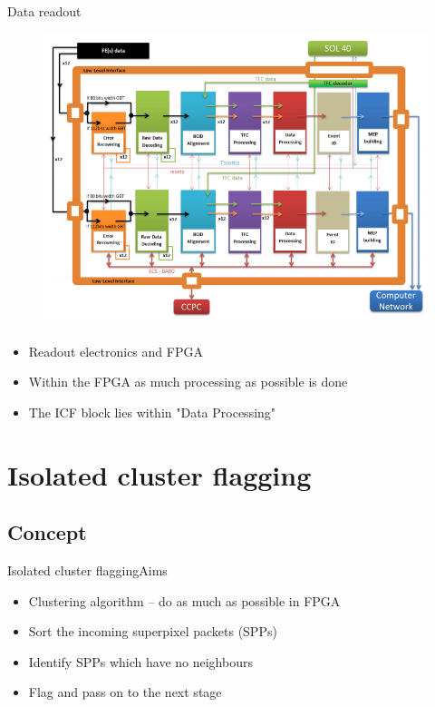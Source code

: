 \documentclass{beamer}
\begin{document}
\begin{frame}{Data readout}
  \begin{figure}
    \begin{center}
      \includegraphics[height=0.5\textheight]{figs/data-readout-chain}
    \end{center}
    \vspace*{-0.5cm}
  \end{figure}
  \begin{itemize}
    \item
      Readout electronics and FPGA
    \item
      Within the FPGA as much processing as possible is done
    \item
      The ICF block lies within "Data Processing"
  \end{itemize}
\end{frame}


\section{Isolated cluster flagging}
\subsection{Concept}
\begin{frame}{Isolated cluster flagging}{Aims}
  \begin{itemize}
    \item
      Clustering algorithm -- do as much as possible in FPGA
    \item
      Sort the incoming superpixel packets (SPPs)
    \item
      Identify SPPs which have no neighbours
    \item
      Flag and pass on to the next stage
  \end{itemize}
\end{frame}
\end{document}
